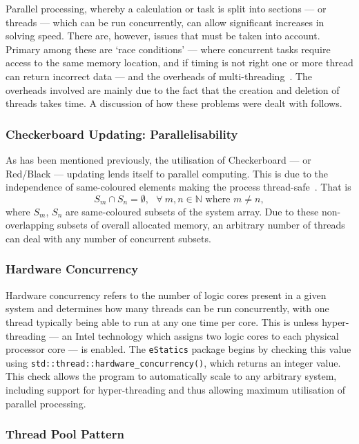 	Parallel processing, whereby a calculation or task is split into sections --- or threads --- which can be run concurrently, can allow significant increases in solving speed. There are, however, issues that must be taken into account. Primary among these are `race conditions' --- where concurrent tasks require access to the same memory location, and if timing is not right one or more thread can return incorrect data --- and the overheads of multi-threading~\cite{kleiman}. The overheads involved are mainly due to the fact that the creation and deletion of threads takes time. A discussion of how these problems were dealt with follows.
		
		\subsubsection{Checkerboard Updating: Parallelisability}
		
		As has been mentioned previously, the utilisation of Checkerboard --- or Red/Black --- updating lends itself to parallel computing. This is due to the independence of same-coloured elements making the process thread-safe~\cite{wallach}. That is 
		\[
		S_m \cap S_n = \emptyset, \ \ \ \forall \  m, n \in \mathbb{N} \text{ where } m \neq n,
		\]
		where $S_m$, $S_n$ are same-coloured subsets of the system array. Due to these non-overlapping subsets of overall allocated memory, an arbitrary number of threads can deal with any number of concurrent subsets.
		
		\subsubsection{Hardware Concurrency}
		
			Hardware concurrency refers to the number of logic cores present in a given system and determines how many threads can be run concurrently, with one thread typically being able to run at any one time per core. This is unless hyper-threading --- an Intel technology which assigns two logic cores to each physical processor core --- is enabled. The \lstinline|eStatics| package begins by checking this value using \lstinline|std::thread::hardware_concurrency()|, which returns an integer value. This check allows the program to automatically scale to any arbitrary system, including support for hyper-threading and thus allowing maximum utilisation of parallel processing.
		
		\subsubsection{Thread Pool Pattern}
		
